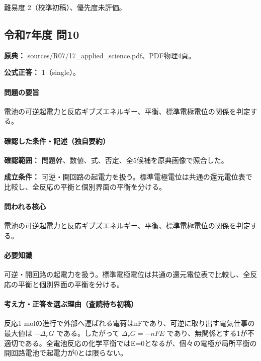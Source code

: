 \par 難易度 2（校準初稿）、優先度未評価。

\subsection{令和7年度 問10}
\label{q:r07-reg-applied-10}

\noindent\textbf{原典：} sources/R07/17\_applied\_science.pdf、PDF物理4頁。

\textbf{公式正答：} 1（single）。

\paragraph{問題の要旨} 電池の可逆起電力と反応ギブズエネルギー、平衡、標準電極電位の関係を判定する。

\paragraph{確認した条件・記述（独自要約）}\mbox{}\par

\noindent\textbf{確認範囲：} 問題幹、数値、式、否定、全5候補を原典画像で照合した。\par

\noindent\textbf{成立条件：} 可逆・開回路の起電力を扱う。標準電極電位は共通の還元電位表で比較し、全反応の平衡と個別界面の平衡を分ける。\par

\paragraph{問われる核心} 電池の可逆起電力と反応ギブズエネルギー、平衡、標準電極電位の関係を判定する。

\paragraph{必要知識} 可逆・開回路の起電力を扱う。標準電極電位は共通の還元電位表で比較し、全反応の平衡と個別界面の平衡を分ける。

\paragraph{考え方・正答を選ぶ理由（査読待ち初稿）} 反応1 molの進行で外部へ運ばれる電荷はnFであり、可逆に取り出す電気仕事の最大値は \(-\Delta_rG\) である。したがって \(\Delta_rG=-nFE\) であり、無関係とする1が不適切である。全電池反応の化学平衡ではE=\allowbreak{}0となるが、個々の電極が局所平衡の開回路電池で起電力が0とは限らない。

